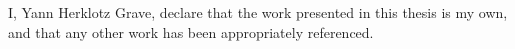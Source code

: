 
I, Yann Herklotz Grave, declare that the work presented in this thesis is my
own, and that any other work has been appropriately referenced.

